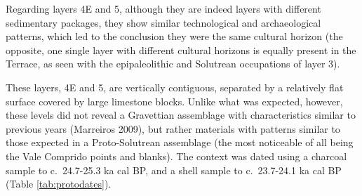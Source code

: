 \documentclass[12pt,twoside]{reedthesis}
\begin{document}
Regarding layers 4E and 5, although they are indeed layers with different sedimentary packages, they show similar technological and archaeological patterns, which led to the conclusion they were the same cultural horizon (the opposite, one single layer with different cultural horizons is equally present in the Terrace, as seen with the epipaleolithic and Solutrean occupations of layer 3).

These layers, 4E and 5, are vertically contiguous, separated by a relatively flat surface covered by large limestone blocks. Unlike what was expected, however, these levels did not reveal a Gravettian assemblage with characteristics similar to previous years (Marreiros 2009), but rather materials with patterns similar to those expected in a Proto-Solutrean assemblage (the most noticeable of all being the Vale Comprido points and blanks). The context was dated using a charcoal sample to c.~24.7-25.3 ka cal BP, and a shell sample to c.~23.7-24.1 ka cal BP (Table \ref{tab:protodates}).
\end{document}
